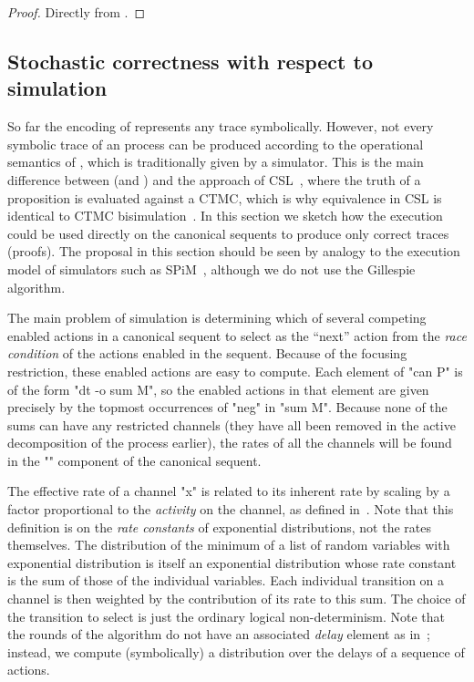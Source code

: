 \documentclass{article}
\begin{document}
\begin{proof}
  Directly from .
\end{proof}

\subsection{Stochastic correctness with respect to simulation}
\label{sec:simul}

So far the \hyllp encoding of \spi represents any \spi trace symbolically. 
However, not every symbolic trace of an \spi process can be produced according to the
operational semantics of \spi, which is traditionally given by a simulator.
This is the main
difference between \hyll (and \spi) and the approach of CSL~\cite{aziz00tcl},
where the truth of a proposition is evaluated against a CTMC, which is why
equivalence in CSL is identical to CTMC bisimulation~\cite{desharmais03jlap}. In
this section we sketch how the execution could be used directly on the canonical
sequents to produce only correct traces (proofs). The proposal in this section
should be seen by analogy to the execution model of \spi simulators such as
SPiM~\cite{phillips04cmmb}, although we do not use the Gillespie algorithm.

The main problem of simulation is determining which of several competing enabled
actions in a canonical sequent to select as the ``next'' action from the
\emph{race condition} of the actions enabled in the sequent. Because of the
focusing restriction, these enabled actions are easy to compute. Each element of
"can P" is of the form "dt -o sum M", so the enabled actions in that element are
given precisely by the topmost occurrences of "neg" in "sum M". Because none of
the sums can have any restricted channels (they have all been removed in the
active decomposition of the process earlier), the rates of all the channels will
be found in the "" component of the canonical sequent. 

The effective rate of a channel "x" is related to its inherent rate by scaling
by a factor proportional to the \emph{activity} on the channel, as defined
in~\cite{phillips04cmmb}. Note that this definition is on the \emph{rate
  constants} of exponential distributions, not the rates themselves. The
distribution of the minimum of a list of random variables with exponential
distribution is itself an exponential distribution whose rate constant is the
sum of those of the individual variables. Each individual transition on a
channel is then weighted by the contribution of its rate to this sum. The choice
of the transition to select is just the ordinary logical non-determinism. Note
that the rounds of the algorithm do not have an associated \emph{delay} element
as in~\cite{phillips04cmmb}; instead, we compute (symbolically) a distribution
over the delays of a sequence of actions.
\end{document}
